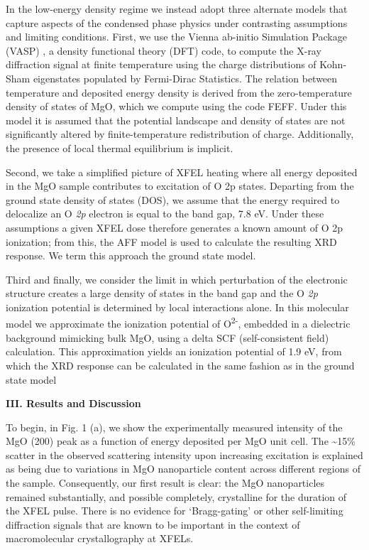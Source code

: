 In the low-energy density regime we instead adopt three alternate models
that capture aspects of the condensed phase physics under contrasting
assumptions and limiting conditions. First, we use the Vienna ab-initio
Simulation Package (VASP) \cite{hafner2008ab}, a density functional theory (DFT)
code, to compute the X-ray diffraction signal at finite temperature
using the charge distributions of Kohn-Sham eigenstates populated by
Fermi-Dirac Statistics. The relation between temperature and deposited
energy density is derived from the zero-temperature density of states of
MgO, which we compute using the code FEFF. \cite{ankudinov1998real} Under this model it
is assumed that the potential landscape and density of states are not
significantly altered by finite-temperature redistribution of charge.
Additionally, the presence of local thermal equilibrium is implicit.

Second, we take a simplified picture of XFEL heating where all energy
deposited in the MgO sample contributes to excitation of O 2p states.
Departing from the ground state density of states (DOS), we assume that
the energy required to delocalize an O \emph{2p} electron is equal to
the band gap, 7.8 eV. Under these assumptions a given XFEL dose
therefore generates a known amount of O 2p ionization; from this, the
AFF model is used to calculate the resulting XRD response. We term this
approach the ground state model.

Third and finally, we consider the limit in which perturbation of the
electronic structure creates a large density of states in the band gap
and the O \emph{2p} ionization potential is determined by local
interactions alone. In this molecular model we approximate the
ionization potential of O\textsuperscript{2-}, embedded in a dielectric
background mimicking bulk MgO, using a delta SCF (self-consistent field)
calculation. \cite{neese2006critical} This approximation yields an ionization potential
of 1.9 eV, from which the XRD response can be calculated in the same
fashion as in the ground state model

\textbf{III. Results and Discussion}

To begin, in Fig. 1 (a), we show the experimentally measured intensity
of the MgO (200) peak as a function of energy deposited per MgO unit
cell. The \textasciitilde{}15\% scatter in the observed scattering
intensity upon increasing excitation is explained as being due to
variations in MgO nanoparticle content across different regions of the
sample. Consequently, our first result is clear: the MgO nanoparticles
remained substantially, and possible completely, crystalline for the
duration of the XFEL pulse. There is no evidence for `Bragg-gating' or
other self-limiting diffraction signals that are known to be important
in the context of macromolecular crystallography at XFELs. \cite{caleman2015ultrafast}

